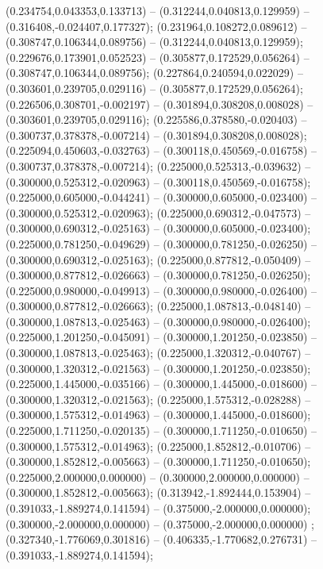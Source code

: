  (0.234754,0.043353,0.133713) -- (0.312244,0.040813,0.129959) -- (0.316408,-0.024407,0.177327);
 (0.231964,0.108272,0.089612) -- (0.308747,0.106344,0.089756) -- (0.312244,0.040813,0.129959);
 (0.229676,0.173901,0.052523) -- (0.305877,0.172529,0.056264) -- (0.308747,0.106344,0.089756);
 (0.227864,0.240594,0.022029) -- (0.303601,0.239705,0.029116) -- (0.305877,0.172529,0.056264);
 (0.226506,0.308701,-0.002197) -- (0.301894,0.308208,0.008028) -- (0.303601,0.239705,0.029116);
 (0.225586,0.378580,-0.020403) -- (0.300737,0.378378,-0.007214) -- (0.301894,0.308208,0.008028);
 (0.225094,0.450603,-0.032763) -- (0.300118,0.450569,-0.016758) -- (0.300737,0.378378,-0.007214);
 (0.225000,0.525313,-0.039632) -- (0.300000,0.525312,-0.020963) -- (0.300118,0.450569,-0.016758);
 (0.225000,0.605000,-0.044241) -- (0.300000,0.605000,-0.023400) -- (0.300000,0.525312,-0.020963);
 (0.225000,0.690312,-0.047573) -- (0.300000,0.690312,-0.025163) -- (0.300000,0.605000,-0.023400);
 (0.225000,0.781250,-0.049629) -- (0.300000,0.781250,-0.026250) -- (0.300000,0.690312,-0.025163);
 (0.225000,0.877812,-0.050409) -- (0.300000,0.877812,-0.026663) -- (0.300000,0.781250,-0.026250);
 (0.225000,0.980000,-0.049913) -- (0.300000,0.980000,-0.026400) -- (0.300000,0.877812,-0.026663);
 (0.225000,1.087813,-0.048140) -- (0.300000,1.087813,-0.025463) -- (0.300000,0.980000,-0.026400);
 (0.225000,1.201250,-0.045091) -- (0.300000,1.201250,-0.023850) -- (0.300000,1.087813,-0.025463);
 (0.225000,1.320312,-0.040767) -- (0.300000,1.320312,-0.021563) -- (0.300000,1.201250,-0.023850);
 (0.225000,1.445000,-0.035166) -- (0.300000,1.445000,-0.018600) -- (0.300000,1.320312,-0.021563);
 (0.225000,1.575312,-0.028288) -- (0.300000,1.575312,-0.014963) -- (0.300000,1.445000,-0.018600);
 (0.225000,1.711250,-0.020135) -- (0.300000,1.711250,-0.010650) -- (0.300000,1.575312,-0.014963);
 (0.225000,1.852812,-0.010706) -- (0.300000,1.852812,-0.005663) -- (0.300000,1.711250,-0.010650);
 (0.225000,2.000000,0.000000) -- (0.300000,2.000000,0.000000) -- (0.300000,1.852812,-0.005663);
 (0.313942,-1.892444,0.153904) -- (0.391033,-1.889274,0.141594) -- (0.375000,-2.000000,0.000000);
 (0.300000,-2.000000,0.000000) -- (0.375000,-2.000000,0.000000) ;
 (0.327340,-1.776069,0.301816) -- (0.406335,-1.770682,0.276731) -- (0.391033,-1.889274,0.141594);
